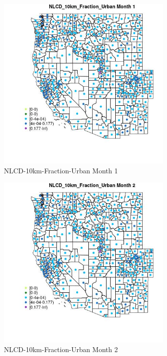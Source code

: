 \begin{figure} 
\centering  
\includegraphics[width=0.77\textwidth]{Code_Outputs/df_report_ML_predictors_CountyCentroid_Locations_Dates_2008-01-01to2018-12-31_MapObsMo1NLCD_10km_Fraction_Urban.jpg} 
\caption{\label{fig:df_report_ML_predictors_CountyCentroid_Locations_Dates_2008-01-01to2018-12-31MapObsMo1NLCD_10km_Fraction_Urban}NLCD-10km-Fraction-Urban Month 1} 
\end{figure} 
 

\begin{figure} 
\centering  
\includegraphics[width=0.77\textwidth]{Code_Outputs/df_report_ML_predictors_CountyCentroid_Locations_Dates_2008-01-01to2018-12-31_MapObsMo2NLCD_10km_Fraction_Urban.jpg} 
\caption{\label{fig:df_report_ML_predictors_CountyCentroid_Locations_Dates_2008-01-01to2018-12-31MapObsMo2NLCD_10km_Fraction_Urban}NLCD-10km-Fraction-Urban Month 2} 
\end{figure} 
 

